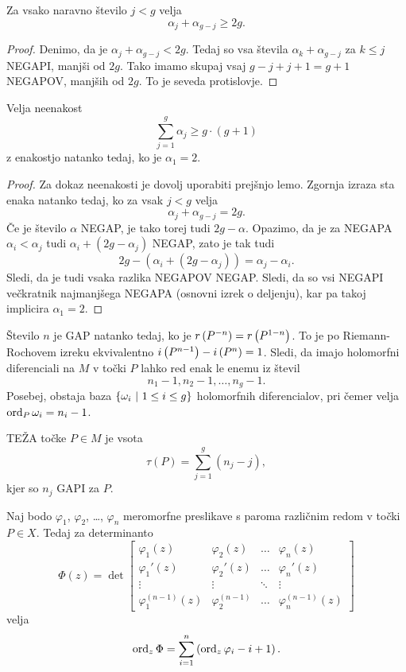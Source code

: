 \begin{lema}
Za vsako naravno število $j < g$ velja
\[
\alpha_j + \alpha_{g-j} \geq 2g.
\]
\end{lema}

\begin{proof}
Denimo, da je $\alpha_j + \alpha_{g-j} < 2g$. Tedaj so vsa števila
$\alpha_k + \alpha_{g-j}$ za $k \leq j$ NEGAPI, manjši od $2g$.
Tako imamo skupaj vsaj $g-j + j + 1 = g+1$ NEGAPOV, manjših od
$2g$. To je seveda protislovje.
\end{proof}

\begin{lema}
Velja neenakost
\[
\sum_{j=1}^{g} \alpha_j \geq g \cdot(g+1)
\]
z enakostjo natanko tedaj, ko je $\alpha_1 = 2$.
\end{lema}

\begin{proof}
Za dokaz neenakosti je dovolj uporabiti prejšnjo lemo. Zgornja
izraza sta enaka natanko tedaj, ko za vsak $j < g$ velja
\[
\alpha_j + \alpha_{g-j} = 2g.
\]
Če je število $\alpha$ NEGAP, je tako torej tudi $2g - \alpha$.
Opazimo, da je za NEGAPA $\alpha_i < \alpha_j$ tudi
$\alpha_i + (2g - \alpha_j)$ NEGAP, zato je tak tudi
\[
2g - (\alpha_i + (2g - \alpha_j)) = \alpha_j - \alpha_i.
\]
Sledi, da je tudi vsaka razlika NEGAPOV NEGAP. Sledi, da so vsi
NEGAPI večkratnik najmanjšega NEGAPA (osnovni izrek o deljenju),
kar pa takoj implicira $\alpha_1 = 2$.
\end{proof}

Število $n$ je GAP natanko tedaj, ko je
$r \left(P^{-n}\right) = r \left(P^{1-n}\right)$. To je po Riemann-Rochovem izreku
ekvivalentno $i \left(P^{n-1}\right) - i \left(P^n\right) = 1$. Sledi, da imajo
holomorfni diferenciali na $M$ v točki $P$ lahko red enak le enemu
iz števil
\[
n_1 - 1, n_2 - 1, \dots, n_g - 1.
\]
Posebej, obstaja baza $\left\{\omega_i~\middle\vert~1 \leq i \leq g\right\}$
holomorfnih diferencialov, pri čemer velja
$\operatorname{ord}_P \omega_i = n_i - 1$.

\begin{definicija}
TEŽA točke $P \in M$ je vsota
\[
\tau(P) = \sum_{j=1}^g (n_j - j),
\]
kjer so $n_j$ GAPI za $P$.
\end{definicija}

\begin{lema}
Naj bodo $\varphi_1$, $\varphi_2$, \dots, $\varphi_n$ meromorfne
preslikave s paroma različnim redom v točki $P \in X$. Tedaj za
determinanto
\[
\Phi(z) = \det
\begin{bmatrix}
\varphi_1(z)    & \varphi_2(z)  & \dots  & \varphi_n(z)  \\
\varphi_1'(z)   & \varphi_2'(z) & \dots  & \varphi_n'(z) \\
\vdots          & \vdots        & \ddots & \vdots        \\
\varphi_1^{(n-1)}(z)            & \varphi_2^{(n-1)}      &
\dots                           & \varphi_n^{(n-1)}(z)
\end{bmatrix}
\]
velja
\[
\operatorname{ord}_z \Phi = \sum_{i=1}^n \left(\operatorname{ord}_z \varphi_i - i + 1\right).
\]
\end{lema}

